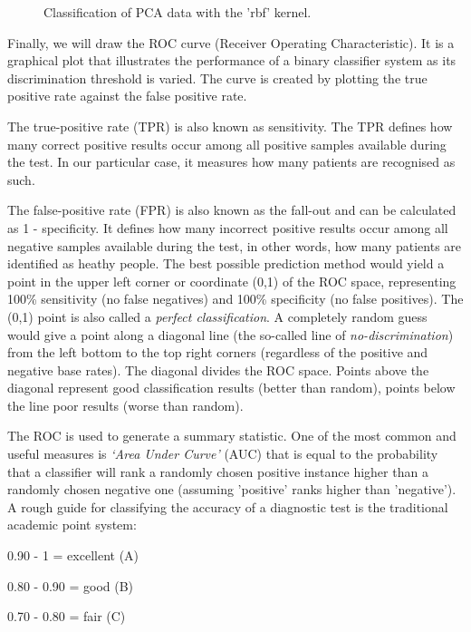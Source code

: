 \begin{figure}[H]
	\centering
	\caption{Classification of PCA data with the 'rbf' kernel.}
	\label{fig:Classification3D_PCA_rbf}
\end{figure}

Finally, we will draw the ROC curve (Receiver Operating Characteristic). It  is a graphical plot that illustrates the performance of a binary classifier system as its discrimination threshold is varied. The curve is created by plotting the true positive rate against the false positive rate\cite{ROC1}.

The true-positive rate (TPR) is also known as sensitivity. The TPR defines how many correct positive results occur among all positive samples available during the test. In our particular case, it measures how many patients are recognised as such.

The false-positive rate (FPR) is also known as the fall-out and can be calculated as 1 - specificity. It defines how many incorrect positive results occur among all negative samples available during the test, in other words, how many patients are identified as heathy people.
The best possible prediction method would yield a point in the upper left corner or coordinate (0,1) of the ROC space, representing 100\% sensitivity (no false negatives) and 100\% specificity (no false positives). The (0,1) point is also called a \textit{perfect classification}. A completely random guess would give a point along a diagonal line (the so-called line of \textit{no-discrimination}) from the left bottom to the top right corners (regardless of the positive and negative base rates). The diagonal divides the ROC space. Points above the diagonal represent good classification results (better than random), points below the line poor results (worse than random)\cite{ROC1}.

The ROC is used to generate a summary statistic. One of the most common and useful measures is \textit{‘Area Under Curve’} (AUC) that is equal to the probability that a classifier will rank a randomly chosen positive instance higher than a randomly chosen negative one (assuming 'positive' ranks higher than 'negative'). A rough guide for classifying the accuracy of a diagnostic test is the traditional academic point system\cite{ROC2}:

0.90 - 1 = excellent (A)

0.80 - 0.90 = good (B)	

0.70 - 0.80 = fair (C)

